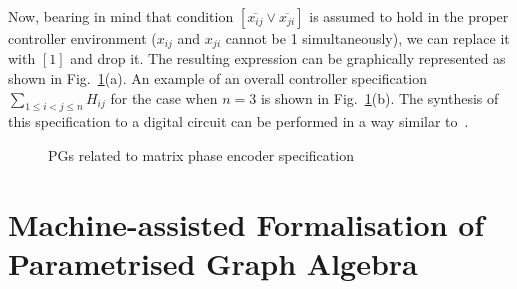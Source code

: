 Now, bearing in mind that condition $[\overline{x_{ij}}\vee\overline{x_{ji}}]$
is assumed to hold in the proper controller environment ($x_{ij}$
and $x_{ji}$ cannot be 1 simultaneously), we can replace it with
$[1]$ and drop it. The resulting expression can be graphically represented
as shown in Fig.~\ref{fig:CGs-related-to}(a). An example of an overall
controller specification ${\displaystyle \sum_{1\le i<j\le n}}H_{ij}$
for the case when $n=3$ is shown in Fig.~\ref{fig:CGs-related-to}(b).
The synthesis of this specification to a digital circuit can be performed
in a way similar to~\cite{2010_mokhov_ieee}.

\begin{figure}
\hfill{}\hfill{}\hfill{}

\caption{PGs related to matrix phase encoder specification\label{fig:CGs-related-to}}
\vspace{-6mm}
\end{figure}


\section{Machine-assisted Formalisation of Parametrised Graph Algebra}

